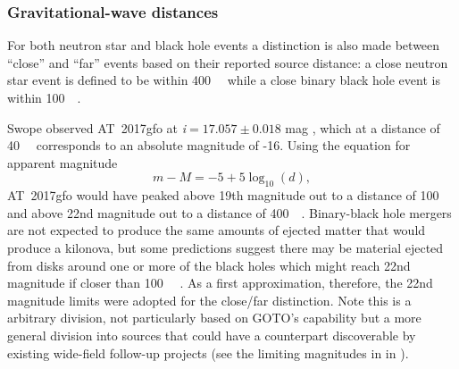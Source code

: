 \begin{colsection}
\subsubsection{Gravitational-wave distances}

For both neutron star and black hole events a distinction is also made between ``close'' and ``far'' events based on their reported source distance: a close neutron star event is defined to be within \SI{400}{\mega\parsec} while a close binary black hole event is within \SI{100}{\mega\parsec}.

Swope observed AT~2017gfo at \textit{i}$=17.057\pm0.018$ mag \citep{GW170817_Swope}, which at a distance of \SI{40}{\mega\parsec} corresponds to an absolute magnitude of -16. Using the equation for apparent magnitude
%
\begin{equation}
    m-M = -5 +5\log_{10}(d),
    \label{eq:absolute_magnitude}
\end{equation}
%
AT~2017gfo would have peaked above 19th magnitude out to a distance of \SI{100}{\mega\parsec} and above 22nd magnitude out to a distance of \SI{400}{\mega\parsec}. Binary-black hole mergers are not expected to produce the same amounts of ejected matter that would produce a kilonova, but some predictions suggest there may be material ejected from disks around one or more of the black holes which might reach 22nd magnitude if closer than \SI{100}{\mega\parsec} \citep{BBH_EM}. As a first approximation, therefore, the 22nd magnitude limits were adopted for the close/far distinction. Note this is a arbitrary division, not particularly based on GOTO's capability but a more general division into sources that could have a counterpart discoverable by existing wide-field follow-up projects (see the limiting magnitudes in  in ).

\newpage


\end{colsection}
